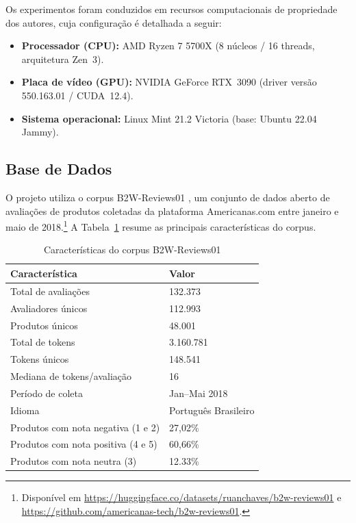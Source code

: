 \documentclass{IEEEtran}
\begin{document}
Os experimentos foram conduzidos em recursos computacionais de propriedade
dos autores, cuja configuração é detalhada a seguir:

\begin{itemize}
  \item \textbf{Processador (CPU):} AMD Ryzen 7 5700X (8 núcleos / 16 threads,
        arquitetura Zen~3).
  \item \textbf{Placa de vídeo (GPU):} NVIDIA GeForce RTX~3090 (driver versão
        550.163.01 / CUDA~12.4).
  \item \textbf{Sistema operacional:} Linux Mint 21.2 Victoria
        (base: Ubuntu 22.04 Jammy).
\end{itemize}



\subsection{Base de Dados}
\label{subsec:dataset}
O projeto utiliza o corpus B2W-Reviews01 \cite{real2019b2w}, um conjunto de dados aberto de avaliações de produtos coletadas da plataforma Americanas.com entre janeiro e maio de 2018.\footnote{Disponível em \url{https://huggingface.co/datasets/ruanchaves/b2w-reviews01} e \url{https://github.com/americanas-tech/b2w-reviews01}.} A Tabela~\ref{tab:dataset} resume as principais características do corpus.

\begin{table}[htbp]
  \centering
  \caption{Características do corpus B2W-Reviews01}
  \label{tab:dataset}
  \begin{tabular}{ll}
    \toprule
    \textbf{Característica} & \textbf{Valor} \\
    \midrule
    Total de avaliações & 132.373 \\
    Avaliadores únicos & 112.993 \\
    Produtos únicos & 48.001 \\
    Total de tokens & 3.160.781 \\
    Tokens únicos & 148.541 \\
    Mediana de tokens/avaliação & 16 \\
    Período de coleta & Jan--Mai 2018 \\
    Idioma & Português Brasileiro \\
    Produtos com nota negativa (1 e 2) & 27,02\% \\
    Produtos com nota positiva (4 e 5) & 60,66\% \\
    Produtos com nota neutra (3) & 12.33\% \\
    \bottomrule
  \end{tabular}
\end{table}
\end{document}
